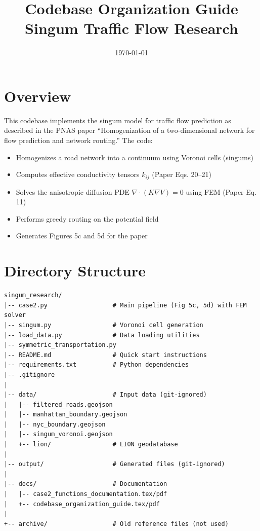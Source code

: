 \documentclass[11pt]{article}
\title{Codebase Organization Guide\\
\large Singum Traffic Flow Research}
\author{}
\date{\today}
\begin{document}
\maketitle

\tableofcontents
\newpage

\section{Overview}

This codebase implements the singum model for traffic flow prediction as described in the PNAS paper ``Homogenization of a two-dimensional network for flow prediction and network routing.'' The code:

\begin{itemize}[noitemsep]
    \item Homogenizes a road network into a continuum using Voronoi cells (singums)
    \item Computes effective conductivity tensors $k_{ij}$ (Paper Eqs. 20--21)
    \item Solves the anisotropic diffusion PDE $\nabla \cdot (K \nabla V) = 0$ using FEM (Paper Eq. 11)
    \item Performs greedy routing on the potential field
    \item Generates Figures 5c and 5d for the paper
\end{itemize}

\section{Directory Structure}

\begin{verbatim}
singum_research/
|-- case2.py                  # Main pipeline (Fig 5c, 5d) with FEM solver
|-- singum.py                 # Voronoi cell generation
|-- load_data.py              # Data loading utilities
|-- symmetric_transportation.py
|-- README.md                 # Quick start instructions
|-- requirements.txt          # Python dependencies
|-- .gitignore
|
|-- data/                     # Input data (git-ignored)
|   |-- filtered_roads.geojson
|   |-- manhattan_boundary.geojson
|   |-- nyc_boundary.geojson
|   |-- singum_voronoi.geojson
|   +-- lion/                 # LION geodatabase
|
|-- output/                   # Generated files (git-ignored)
|
|-- docs/                     # Documentation
|   |-- case2_functions_documentation.tex/pdf
|   +-- codebase_organization_guide.tex/pdf
|
+-- archive/                  # Old reference files (not used)
\end{verbatim}
\end{document}
